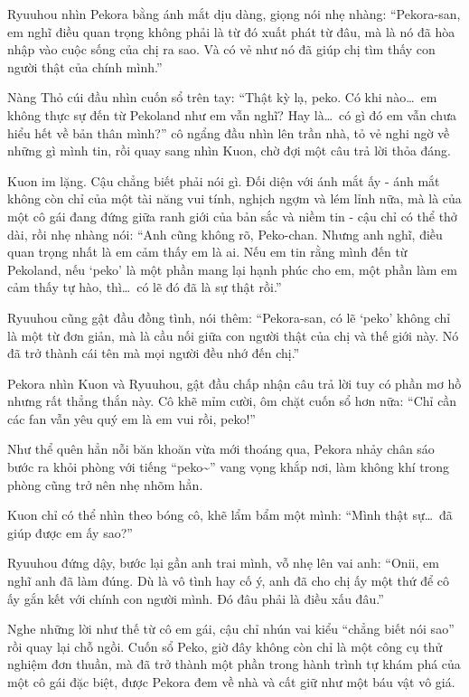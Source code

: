 \documentclass[../main.tex]{subfiles}
\begin{document}
Ryuuhou nhìn Pekora bằng ánh mắt dịu dàng, giọng nói nhẹ nhàng: ``Pekora-san, em nghĩ điều quan trọng không phải là từ đó xuất phát từ đâu, mà là nó đã hòa nhập vào cuộc sống của chị ra sao. Và có vẻ như nó đã giúp chị tìm thấy con người thật của chính mình.''

Nàng Thỏ cúi đầu nhìn cuốn sổ trên tay: ``Thật kỳ lạ, peko. Có khi nào\dots\ em không thực sự đến từ Pekoland như em vẫn nghĩ? Hay là\dots\ có gì đó em vẫn chưa hiểu hết về bản thân mình?'' cô ngẩng đầu nhìn lên trần nhà, tỏ vẻ nghi ngờ về những gì mình tin, rồi quay sang nhìn Kuon, chờ đợi một câu trả lời thỏa đáng.

Kuon im lặng. Cậu chẳng biết phải nói gì. Đối diện với ánh mắt ấy - ánh mắt không còn chỉ của một tài năng vui tính, nghịch ngợm và lém lỉnh nữa, mà là của một cô gái đang đứng giữa ranh giới của bản sắc và niềm tin - cậu chỉ có thể thở dài, rồi nhẹ nhàng nói: ``Anh cũng không rõ, Peko-chan. Nhưng anh nghĩ, điều quan trọng nhất là em cảm thấy em là ai. Nếu em tin rằng mình đến từ Pekoland, nếu `peko' là một phần mang lại hạnh phúc cho em, một phần làm em cảm thấy tự hào, thì\dots\ có lẽ đó đã là sự thật rồi.''

Ryuuhou cũng gật đầu đồng tình, nói thêm: ``Pekora-san, có lẽ `peko' không chỉ là một từ đơn giản, mà là cầu nối giữa con người thật của chị và thế giới này. Nó đã trở thành cái tên mà mọi người đều nhớ đến chị.''

Pekora nhìn Kuon và Ryuuhou, gật đầu chấp nhận câu trả lời tuy có phần mơ hồ nhưng rất thẳng thắn này. Cô khẽ mỉm cười, ôm chặt cuốn sổ hơn nữa: ``Chỉ cần các fan vẫn yêu quý em là em vui rồi, peko!''

Như thể quên hẳn nỗi băn khoăn vừa mới thoáng qua, Pekora nhảy chân sáo bước ra khỏi phòng với tiếng ``peko\~{}'' vang vọng khắp nơi, làm không khí trong phòng cũng trở nên nhẹ nhõm hẳn.

Kuon chỉ có thể nhìn theo bóng cô, khẽ lẩm bẩm một mình: ``Mình thật sự\dots\ đã giúp được em ấy sao?''

Ryuuhou đứng dậy, bước lại gần anh trai mình, vỗ nhẹ lên vai anh: ``Onii, em nghĩ anh đã làm đúng. Dù là vô tình hay cố ý, anh đã cho chị ấy một thứ để cô ấy gắn kết với chính con người mình. Đó đâu phải là điều xấu đâu.''

Nghe những lời như thế từ cô em gái, cậu chỉ nhún vai kiểu ``chẳng biết nói sao'' rồi quay lại chỗ ngồi. Cuốn sổ Peko, giờ đây không còn chỉ là một công cụ thử nghiệm đơn thuần, mà đã trở thành một phần trong hành trình tự khám phá của một cô gái đặc biệt, được Pekora đem về nhà và cất giữ như một báu vật vô giá.
\end{document}

